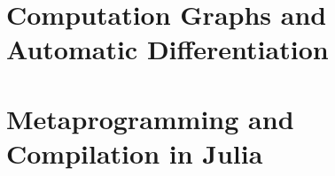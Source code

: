 \section{Computation Graphs and Automatic Differentiation}
\label{sec:graph-track-autom}


\section{Metaprogramming and Compilation in Julia}
\label{sec:metapr-comp-julia}




